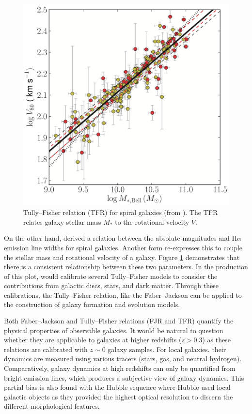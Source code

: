 \documentclass[12pt, twocolumn, nofootinbib]{revtex4-1}    %
\begin{document}
\begin{figure}
\includegraphics[width=\linewidth]{introduction/reyes_2011}
\caption{Tully--Fisher relation (TFR) for spiral galaxies (from \citealt{2012ApJS..203...17R}). The TFR relates galaxy stellar mass $M_*$ to the rotational velocity $V$.}
\label{fig:tully_fisher}
\end{figure}

On the other hand, \cite{1977A&A....54..661T} derived a relation between the absolute magnitudes and H$\alpha$ emission line widths for spiral galaxies. Another form re-expresses this to couple the stellar mass and rotational velocity of a galaxy. Figure \ref{fig:tully_fisher} demonstrates that there is a consistent relationship between these two parameters. In the production of this plot, \cite{2011MNRAS.417.2347R} would calibrate several Tully--Fisher models to consider the contributions from galactic discs, stars, and dark matter. Through these calibrations, the Tully--Fisher relation, like the Faber--Jackson can be applied to the construction of galaxy formation and evolution models.

Both Faber--Jackson and Tully--Fisher relations (FJR and TFR) quantify the physical properties of observable galaxies. It would be natural to question whether they are applicable to galaxies at higher redshifts ($z>0.3$) as these relations are calibrated with $z\sim0$ galaxy samples. For local galaxies, their dynamics are measured using various tracers (stars, gas, and neutral hydrogen). Comparatively, galaxy dynamics at high redshifts can only be quantified from bright emission lines, which produces a subjective view of galaxy dynamics. This partial bias is also found with the Hubble sequence where Hubble used local galactic objects as they provided the highest optical resolution to discern the different morphological features. 
\end{document}
